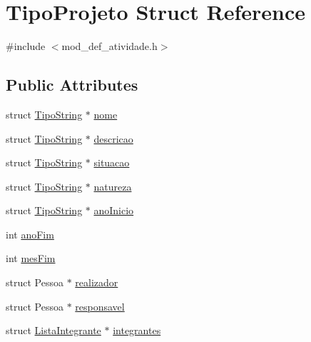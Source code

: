 \hypertarget{structTipoProjeto}{\section{Tipo\+Projeto Struct Reference}
\label{structTipoProjeto}
}


{\ttfamily \#include $<$mod\+\_\+def\+\_\+atividade.\+h$>$}

\subsection*{Public Attributes}
\begin{DoxyCompactItemize}
\item 
struct \hyperlink{structTipoString}{Tipo\+String} $\ast$ \hyperlink{structTipoProjeto_a84112a84029e69cad4d8d97b9c61f45b}{nome}
\item 
struct \hyperlink{structTipoString}{Tipo\+String} $\ast$ \hyperlink{structTipoProjeto_a250bff55dc01a740809283f62c25153b}{descricao}
\item 
struct \hyperlink{structTipoString}{Tipo\+String} $\ast$ \hyperlink{structTipoProjeto_af7841313daf1014d1be23fc0cb115e5a}{situacao}
\item 
struct \hyperlink{structTipoString}{Tipo\+String} $\ast$ \hyperlink{structTipoProjeto_a2a7bffb56a5124f36a049e6daa525e79}{natureza}
\item 
struct \hyperlink{structTipoString}{Tipo\+String} $\ast$ \hyperlink{structTipoProjeto_a9f89a134a5023bc7617aa127c0e97325}{ano\+Inicio}
\item 
int \hyperlink{structTipoProjeto_af846c3bdcb4141e92b5f983d65a5668c}{ano\+Fim}
\item 
int \hyperlink{structTipoProjeto_a0980809407346b1316f5d1ec686d1939}{mes\+Fim}
\item 
struct Pessoa $\ast$ \hyperlink{structTipoProjeto_a2eae4616af07378aa2f9cc7045bfae0f}{realizador}
\item 
struct Pessoa $\ast$ \hyperlink{structTipoProjeto_ad8411f55123381a349fa29175ad0037f}{responsavel}
\item 
struct \hyperlink{structListaIntegrante}{Lista\+Integrante} $\ast$ \hyperlink{structTipoProjeto_ac2f21e7d20035ba3ebab69efbbe71c05}{integrantes}
\end{DoxyCompactItemize}


